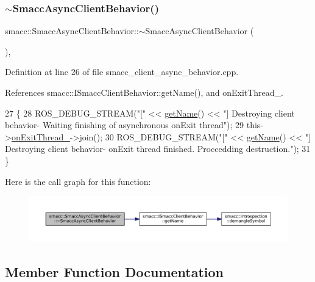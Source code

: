 \subsubsection{\texorpdfstring{$\sim$\+Smacc\+Async\+Client\+Behavior()}{~SmaccAsyncClientBehavior()}}
{\footnotesize\ttfamily smacc\+::\+Smacc\+Async\+Client\+Behavior\+::$\sim$\+Smacc\+Async\+Client\+Behavior (\begin{DoxyParamCaption}{ }\end{DoxyParamCaption})\hspace{0.3cm}{\ttfamily [protected]}, {\ttfamily [virtual]}}



Definition at line 26 of file smacc\+\_\+client\+\_\+async\+\_\+behavior.\+cpp.



References smacc\+::\+I\+Smacc\+Client\+Behavior\+::get\+Name(), and on\+Exit\+Thread\+\_\+.


\begin{DoxyCode}
27     \{
28         ROS\_DEBUG\_STREAM(\textcolor{stringliteral}{"["} << \hyperlink{classsmacc_1_1ISmaccClientBehavior_a18e4bec9460b010f2894c0f7e7064a34}{getName}() << \textcolor{stringliteral}{"] Destroying client behavior- Waiting finishing of
       asynchronous onExit thread"});
29         this->\hyperlink{classsmacc_1_1SmaccAsyncClientBehavior_af2e2b5e95d8281c605fa06e51aad5d00}{onExitThread\_}->join();
30         ROS\_DEBUG\_STREAM(\textcolor{stringliteral}{"["} << \hyperlink{classsmacc_1_1ISmaccClientBehavior_a18e4bec9460b010f2894c0f7e7064a34}{getName}() << \textcolor{stringliteral}{"] Destroying client behavior-  onExit thread finished.
       Proccedding destruction."});
31     \}
\end{DoxyCode}
Here is the call graph for this function\+:
\nopagebreak
\begin{figure}[H]
\begin{center}
\leavevmode
\includegraphics[width=350pt]{classsmacc_1_1SmaccAsyncClientBehavior_a0028345c409db6fdead7a16b23b9f0aa_cgraph}
\end{center}
\end{figure}


\subsection{Member Function Documentation}
\mbox{\label{classsmacc_1_1SmaccAsyncClientBehavior_ab8ca63d40d61554263466fe4c0b5cbd1}} 

